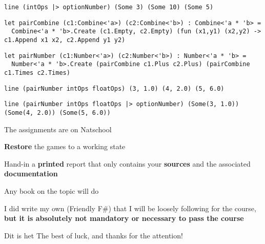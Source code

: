 \documentclass{beamer}
\begin{document}
\begin{frame}[fragile]
\begin{lstlisting}
line (intOps |> optionNumber) (Some 3) (Some 10) (Some 5)
\end{lstlisting}
\end{frame}

\begin{frame}[fragile]
\begin{lstlisting}
let pairCombine (c1:Combine<'a>) (c2:Combine<'b>) : Combine<'a * 'b> = 
  Combine<'a * 'b>.Create (c1.Empty, c2.Empty) (fun (x1,y1) (x2,y2) -> c1.Append x1 x2, c2.Append y1 y2)
\end{lstlisting}
\end{frame}

\begin{frame}[fragile]
\begin{lstlisting}
let pairNumber (c1:Number<'a>) (c2:Number<'b>) : Number<'a * 'b> = 
  Number<'a * 'b>.Create (pairCombine c1.Plus c2.Plus) (pairCombine c1.Times c2.Times)
\end{lstlisting}
\end{frame}

\begin{frame}[fragile]
\begin{lstlisting}
line (pairNumber intOps floatOps) (3, 1.0) (4, 2.0) (5, 6.0)
\end{lstlisting}
\end{frame}

\begin{frame}[fragile]
\begin{lstlisting}
line (pairNumber intOps floatOps |> optionNumber) (Some(3, 1.0)) (Some(4, 2.0)) (Some(5, 6.0))
\end{lstlisting}
\end{frame}

\begin{slide}{
\item The assignments are on Natschool
\item \textbf{Restore} the games to a working state
\item Hand-in a \textbf{printed} report that only contains your \textbf{sources} and the associated \textbf{documentation}
}\end{slide}

\begin{slide}{
\item Any book on the topic will do
\item I did write my own (Friendly F\#) that I will be loosely following for the course, \textbf{but it is absolutely not mandatory or necessary to pass the course}
}\end{slide}


\begin{frame}{Dit is het}
\center
\fontsize{18pt}{7.2}\selectfont
The best of luck, and thanks for the attention!
\end{frame}
\end{document}
